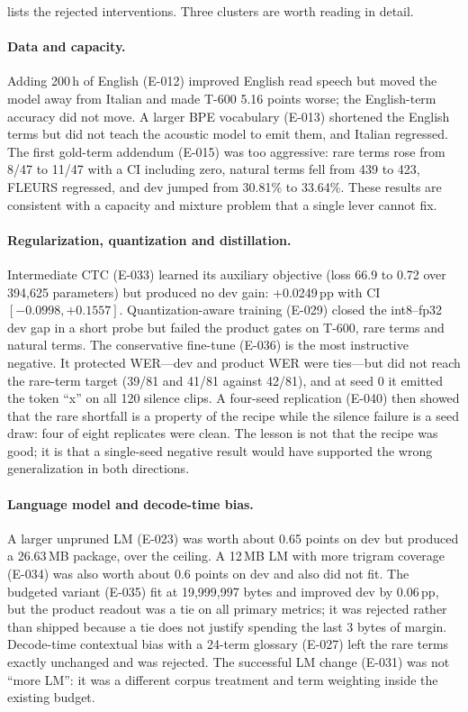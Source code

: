 \documentclass{article}
\begin{document}
 lists the rejected interventions. Three clusters are worth reading in detail.

\paragraph{Data and capacity.}
Adding 200\,h of English (E-012) improved English read speech but moved the model away from
Italian and made T-600 5.16 points worse; the English-term accuracy did not move. A larger BPE
vocabulary (E-013) shortened the English terms but did not teach the acoustic model to emit them,
and Italian regressed. The first gold-term addendum (E-015) was too aggressive: rare terms rose
from 8/47 to 11/47 with a CI including zero, natural terms fell from 439 to 423, FLEURS
regressed, and dev jumped from 30.81\% to 33.64\%. These results are consistent with a capacity
and mixture problem that a single lever cannot fix.

\paragraph{Regularization, quantization and distillation.}
Intermediate CTC (E-033) learned its auxiliary objective (loss 66.9 to 0.72 over 394{,}625
parameters) but produced no dev gain: +0.0249\,pp with CI $[-0.0998,+0.1557]$. Quantization-aware
training (E-029) closed the int8--fp32 dev gap in a short probe but failed the product gates on
T-600, rare terms and natural terms. The conservative fine-tune (E-036) is the most instructive
negative. It protected WER---dev and product WER were ties---but did not reach the rare-term
target (39/81 and 41/81 against 42/81), and at seed 0 it emitted the token ``x'' on all 120
silence clips. A four-seed replication (E-040) then showed that the rare shortfall is a property
of the recipe while the silence failure is a seed draw: four of eight replicates were clean. The
lesson is not that the recipe was good; it is that a single-seed negative result would have
supported the wrong generalization in both directions.

\paragraph{Language model and decode-time bias.}
A larger unpruned LM (E-023) was worth about 0.65 points on dev but produced a 26.63\,MB package,
over the ceiling. A 12\,MB LM with more trigram coverage (E-034) was also worth about 0.6 points
on dev and also did not fit. The budgeted variant (E-035) fit at 19{,}999{,}997 bytes and improved
dev by 0.06\,pp, but the product readout was a tie on all primary metrics; it was rejected rather
than shipped because a tie does not justify spending the last 3 bytes of margin. Decode-time
contextual bias with a 24-term glossary (E-027) left the rare terms exactly unchanged and was
rejected. The successful LM change (E-031) was not ``more LM'': it was a different corpus
treatment and term weighting inside the existing budget.
\end{document}
